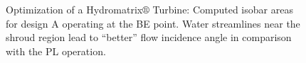 \begin{figure}[h!]
\begin{minipage}[b]{1\linewidth}
 \centering
\end{minipage}
\caption{Optimization of a Hydromatrix$\circledR$ Turbine: Computed isobar areas for design A operating at the BE point. Water streamlines near the shroud region lead to ``better'' flow incidence angle in comparison with the PL operation.}
\label{design-BE-M}
\end{figure}


